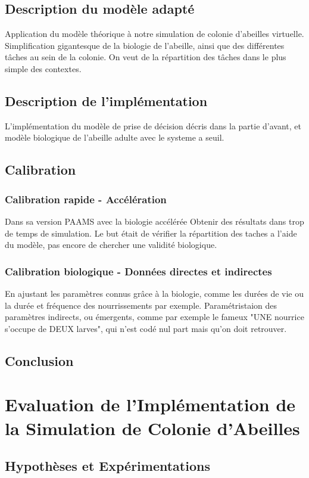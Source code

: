 \documentclass[11pt,a4paper]{report}
\begin{document}
	\section{Description du modèle adapté}
		Application du modèle théorique à notre simulation de colonie d'abeilles virtuelle.
		Simplification gigantesque de la biologie de l'abeille, ainsi que des différentes tâches au sein de la colonie.
		On veut de la répartition des tâches dans le plus simple des contextes.
	\section{Description de l'implémentation}
		L'implémentation du modèle de prise de décision décris dans la partie d'avant, et modèle biologique de l'abeille adulte avec le systeme a seuil.
	\section{Calibration}
		\subsection{Calibration rapide - Accélération}
			Dans sa version PAAMS avec la biologie accélérée
			Obtenir des résultats dans trop de temps de simulation. Le but était de vérifier la répartition des taches a l'aide du modèle, pas encore de chercher une validité biologique.
		\subsection{Calibration biologique - Données directes et indirectes}
			En ajustant les paramètres connus grâce à la biologie, comme les durées de vie ou la durée et fréquence des nourrissements par exemple.
			Paramétristaion des paramètres indirects, ou émergents, comme par exemple le fameux "UNE nourrice s'occupe de DEUX larves", qui n'est codé nul part mais qu'on doit retrouver.
			
	\section*{Conclusion}
	
\chapter{Evaluation de l'Implémentation de la Simulation de Colonie d'Abeilles}
	\section{Hypothèses et Expérimentations}
\end{document}
